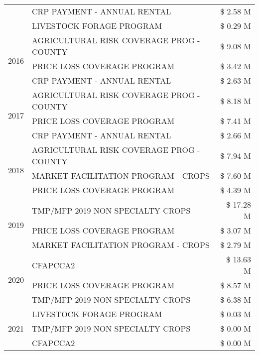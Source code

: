 \begin{tabular}{llr}
 & CRP PAYMENT - ANNUAL RENTAL & \$ 2.58 M \\
 & LIVESTOCK FORAGE PROGRAM & \$ 0.29 M \\
\cline{1-3}
\multirow[t]{3}{*}{2016} & AGRICULTURAL RISK COVERAGE PROG - COUNTY & \$ 9.08 M \\
 & PRICE LOSS COVERAGE PROGRAM & \$ 3.42 M \\
 & CRP PAYMENT - ANNUAL RENTAL & \$ 2.63 M \\
\cline{1-3}
\multirow[t]{3}{*}{2017} & AGRICULTURAL RISK COVERAGE PROG - COUNTY & \$ 8.18 M \\
 & PRICE LOSS COVERAGE PROGRAM & \$ 7.41 M \\
 & CRP PAYMENT - ANNUAL RENTAL & \$ 2.66 M \\
\cline{1-3}
\multirow[t]{3}{*}{2018} & AGRICULTURAL RISK COVERAGE PROG - COUNTY & \$ 7.94 M \\
 & MARKET FACILITATION PROGRAM - CROPS & \$ 7.60 M \\
 & PRICE LOSS COVERAGE PROGRAM & \$ 4.39 M \\
\cline{1-3}
\multirow[t]{3}{*}{2019} & TMP/MFP 2019 NON SPECIALTY CROPS & \$ 17.28 M \\
 & PRICE LOSS COVERAGE PROGRAM & \$ 3.07 M \\
 & MARKET FACILITATION PROGRAM - CROPS & \$ 2.79 M \\
\cline{1-3}
\multirow[t]{3}{*}{2020} & CFAPCCA2 & \$ 13.63 M \\
 & PRICE LOSS COVERAGE PROGRAM & \$ 8.57 M \\
 & TMP/MFP 2019 NON SPECIALTY CROPS & \$ 6.38 M \\
\cline{1-3}
\multirow[t]{3}{*}{2021} & LIVESTOCK FORAGE PROGRAM & \$ 0.03 M \\
 & TMP/MFP 2019 NON SPECIALTY CROPS & \$ 0.00 M \\
 & CFAPCCA2 & \$ 0.00 M \\
\cline{1-3}
\bottomrule
\end{tabular}
